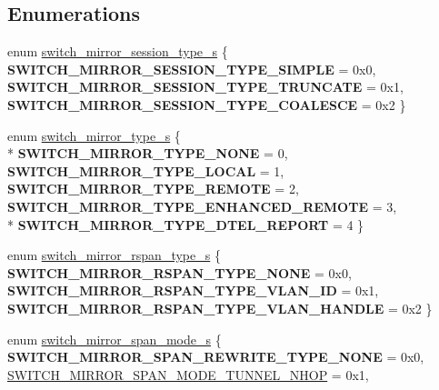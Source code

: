 \subsection*{Enumerations}
\begin{DoxyCompactItemize}
\item 
enum \hyperlink{group__Mirror_ga74ee0e13e7534b52d540c6b4dcc85249}{switch\+\_\+mirror\+\_\+session\+\_\+type\+\_\+s} \{ {\bfseries S\+W\+I\+T\+C\+H\+\_\+\+M\+I\+R\+R\+O\+R\+\_\+\+S\+E\+S\+S\+I\+O\+N\+\_\+\+T\+Y\+P\+E\+\_\+\+S\+I\+M\+P\+L\+E} = 0x0, 
{\bfseries S\+W\+I\+T\+C\+H\+\_\+\+M\+I\+R\+R\+O\+R\+\_\+\+S\+E\+S\+S\+I\+O\+N\+\_\+\+T\+Y\+P\+E\+\_\+\+T\+R\+U\+N\+C\+A\+T\+E} = 0x1, 
{\bfseries S\+W\+I\+T\+C\+H\+\_\+\+M\+I\+R\+R\+O\+R\+\_\+\+S\+E\+S\+S\+I\+O\+N\+\_\+\+T\+Y\+P\+E\+\_\+\+C\+O\+A\+L\+E\+S\+C\+E} = 0x2
 \}
\item 
enum \hyperlink{group__Mirror_ga58d4e2d8a2e2b8efebe22d1adbdd0f2e}{switch\+\_\+mirror\+\_\+type\+\_\+s} \{ \\*
{\bfseries S\+W\+I\+T\+C\+H\+\_\+\+M\+I\+R\+R\+O\+R\+\_\+\+T\+Y\+P\+E\+\_\+\+N\+O\+N\+E} = 0, 
{\bfseries S\+W\+I\+T\+C\+H\+\_\+\+M\+I\+R\+R\+O\+R\+\_\+\+T\+Y\+P\+E\+\_\+\+L\+O\+C\+A\+L} = 1, 
{\bfseries S\+W\+I\+T\+C\+H\+\_\+\+M\+I\+R\+R\+O\+R\+\_\+\+T\+Y\+P\+E\+\_\+\+R\+E\+M\+O\+T\+E} = 2, 
{\bfseries S\+W\+I\+T\+C\+H\+\_\+\+M\+I\+R\+R\+O\+R\+\_\+\+T\+Y\+P\+E\+\_\+\+E\+N\+H\+A\+N\+C\+E\+D\+\_\+\+R\+E\+M\+O\+T\+E} = 3, 
\\*
{\bfseries S\+W\+I\+T\+C\+H\+\_\+\+M\+I\+R\+R\+O\+R\+\_\+\+T\+Y\+P\+E\+\_\+\+D\+T\+E\+L\+\_\+\+R\+E\+P\+O\+R\+T} = 4
 \}
\item 
enum \hyperlink{group__Mirror_ga2123897bf0979e5bfd4b1388faef95ff}{switch\+\_\+mirror\+\_\+rspan\+\_\+type\+\_\+s} \{ {\bfseries S\+W\+I\+T\+C\+H\+\_\+\+M\+I\+R\+R\+O\+R\+\_\+\+R\+S\+P\+A\+N\+\_\+\+T\+Y\+P\+E\+\_\+\+N\+O\+N\+E} = 0x0, 
{\bfseries S\+W\+I\+T\+C\+H\+\_\+\+M\+I\+R\+R\+O\+R\+\_\+\+R\+S\+P\+A\+N\+\_\+\+T\+Y\+P\+E\+\_\+\+V\+L\+A\+N\+\_\+\+I\+D} = 0x1, 
{\bfseries S\+W\+I\+T\+C\+H\+\_\+\+M\+I\+R\+R\+O\+R\+\_\+\+R\+S\+P\+A\+N\+\_\+\+T\+Y\+P\+E\+\_\+\+V\+L\+A\+N\+\_\+\+H\+A\+N\+D\+L\+E} = 0x2
 \}
\item 
enum \hyperlink{group__Mirror_ga2079fb7f359b736e7452ee4ef9064414}{switch\+\_\+mirror\+\_\+span\+\_\+mode\+\_\+s} \{ {\bfseries S\+W\+I\+T\+C\+H\+\_\+\+M\+I\+R\+R\+O\+R\+\_\+\+S\+P\+A\+N\+\_\+\+R\+E\+W\+R\+I\+T\+E\+\_\+\+T\+Y\+P\+E\+\_\+\+N\+O\+N\+E} = 0x0, 
\hyperlink{group__Mirror_gga2079fb7f359b736e7452ee4ef9064414a826cd28ac1ff8673ff5d1f2447d0c607}{S\+W\+I\+T\+C\+H\+\_\+\+M\+I\+R\+R\+O\+R\+\_\+\+S\+P\+A\+N\+\_\+\+M\+O\+D\+E\+\_\+\+T\+U\+N\+N\+E\+L\+\_\+\+N\+H\+O\+P} = 0x1, 

\end{DoxyCompactItemize}
